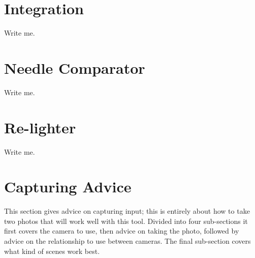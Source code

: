 \documentclass[10pt,a4paper,twoside]{article}
\begin{document}
\section{Integration}
Write me.



\section{Needle Comparator}
Write me.



\section{Re-lighter}
Write me.



\section{Capturing Advice}
\label{capture_advice}
This section gives advice on capturing input; this is entirely about how to take two photos that will work well with this tool.
Divided into four sub-sections it first covers the camera to use, then advice on taking the photo, followed by advice on the relationship to use between cameras. The final sub-section covers what kind of scenes work best.
\end{document}
